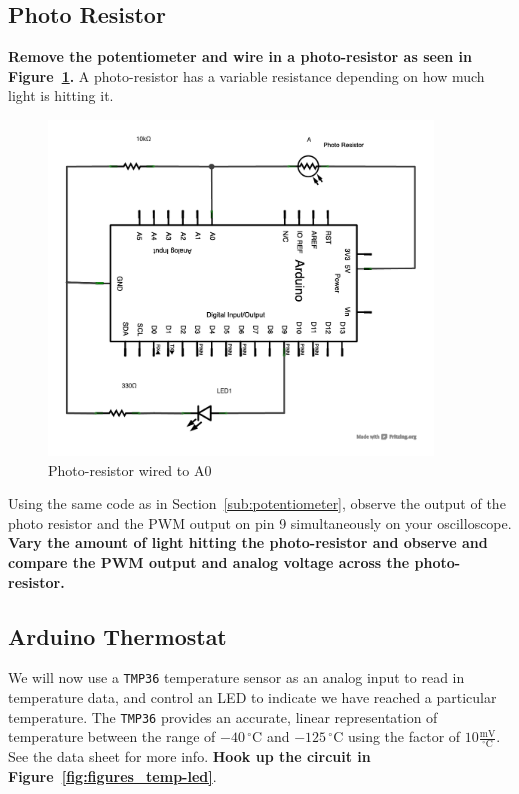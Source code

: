 \documentclass[11pt,a4paper]{article}
\begin{document}

\subsection{Photo Resistor} %
\label{sub:photo_resistor}

\textbf{Remove the potentiometer and wire in a photo-resistor as seen in Figure~\ref{fig:figures_photo-res}.}  A photo-resistor has a variable resistance depending on how much light is hitting it. 
\begin{figure}[htbp]
    \centering
        \includegraphics[height=3.5in]{figures/photo-res.pdf}
    \caption{Photo-resistor wired to A0}
    \label{fig:figures_photo-res}
\end{figure}

Using the same code as in Section~\ref{sub:potentiometer}, observe the output of the photo resistor and the PWM output on pin 9 simultaneously on your oscilloscope.  \textbf{Vary the amount of light hitting the photo-resistor and observe and compare the PWM output and analog voltage across the photo-resistor.}    



\subsection{Arduino Thermostat} %
\label{sub:arduino_thermistat}

We will now use a \texttt{TMP36} temperature sensor as an analog input to read in temperature data, and control an LED to indicate we have reached a particular temperature.  The \texttt{TMP36} provides an accurate, linear representation of temperature between the range of $-40\,^{\circ}\mathrm{C}$ and $-125\,^{\circ}\mathrm{C}$ using the factor of $10 \frac{\mathrm{mV}}{^{\circ}\mathrm{C}}$.\cite{temp}  See the data sheet for more info.\cite{tmpds}  \textbf{Hook up the circuit in Figure~\ref{fig:figures_temp-led}}.
\end{document}
